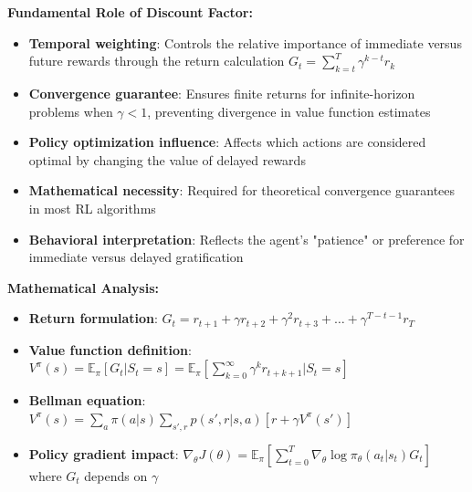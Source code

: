 \documentclass[12pt]{article}
\begin{document}
{{{\textbf{Fundamental Role of Discount Factor:}
\begin{itemize}
    \item \textbf{Temporal weighting}: Controls the relative importance of immediate versus future rewards through the return calculation $G_t = \sum_{k=t}^{T} \gamma^{k-t} r_k$
    \item \textbf{Convergence guarantee}: Ensures finite returns for infinite-horizon problems when $\gamma < 1$, preventing divergence in value function estimates
    \item \textbf{Policy optimization influence}: Affects which actions are considered optimal by changing the value of delayed rewards
    \item \textbf{Mathematical necessity}: Required for theoretical convergence guarantees in most RL algorithms
    \item \textbf{Behavioral interpretation}: Reflects the agent's "patience" or preference for immediate versus delayed gratification
\end{itemize}

\textbf{Mathematical Analysis:}
\begin{itemize}
    \item \textbf{Return formulation}: $G_t = r_{t+1} + \gamma r_{t+2} + \gamma^2 r_{t+3} + \ldots + \gamma^{T-t-1} r_T$
    \item \textbf{Value function definition}: $V^\pi(s) = \mathbb{E}_\pi[G_t | S_t = s] = \mathbb{E}_\pi[\sum_{k=0}^{\infty} \gamma^k r_{t+k+1} | S_t = s]$
    \item \textbf{Bellman equation}: $V^\pi(s) = \sum_a \pi(a|s) \sum_{s',r} p(s',r|s,a)[r + \gamma V^\pi(s')]$
    \item \textbf{Policy gradient impact}: $\nabla_\theta J(\theta) = \mathbb{E}_\pi[\sum_{t=0}^{T} \nabla_\theta \log \pi_\theta(a_t|s_t) G_t]$ where $G_t$ depends on $\gamma$
\end{itemize}

}}}
\end{document}
